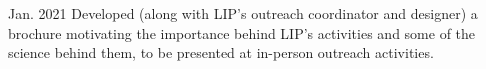 \begin{cventries}
    {}{Jan. 2021}
    {Developed (along with LIP's outreach coordinator and designer) a brochure motivating the importance behind LIP's activities and some of the science behind them, to be presented at in-person outreach activities.}







\end{cventries}